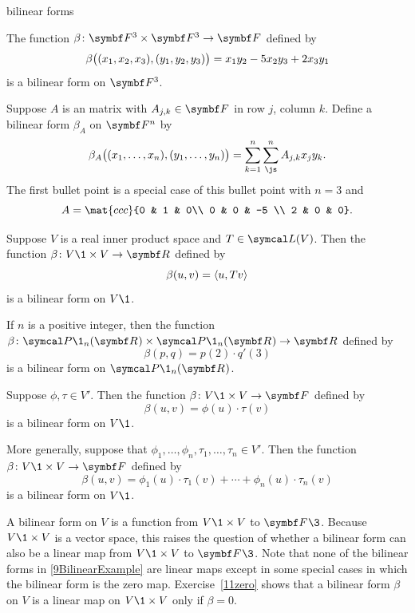 \begin{example}[9BilinearExample]{bilinear forms}
\begin{Itemize}
\item
The function $\fun \beta {\F3 \times \F3} {\F{}}$ defined by
\[
\beta\paren[\big]{ (x_1, x_2, x_3), (y_1, y_2, y_3) } = x_1 y_2 - 5 x_2 y_3 + 2 x_3 y_1
\]
is a bilinear form on $\F3$.

\item
Suppose $A$ is an  matrix with $A_{j,k} \in \F{}$ in row $j$, column $k$. Define a bilinear form $\beta_A$ on $\F n$ by
\[
\beta_A\paren[\big]{ (x_1, \ldots, x_n), (y_1, \ldots, y_n) } = \sum_{k=1}^n \sum_{\js}^n A_{j,k} x_j y_k.
\]
The first bullet point is a special case of this bullet point with $n = 3$ and
\[
A = \mat{ccc}{0 & 1 & 0\\
0 & 0 & -5 \\
2 & 0 & 0}.
\]

\item
Suppose $V$ is a real inner product space and $T \in \L(V)$. Then the function $\fun \beta {V\1 \times V} {\R{}}$ defined by
\[
\beta(u, v) = \ip{u, Tv}
\]
is a bilinear form on $V\1$.

\item
If $n$ is a positive integer, then the function $\fun \beta { \P\1_n(\R{}) \times \P\1_n(\R{}) } {\R{}}$ defined by
\[
\beta(p,q) = p(2) \cdot q'(3)
\]
is a bilinear form on $\P\1_n(\R{})$.

\item
Suppose $\phi, \tau \in V'\!$. Then the function $\fun \beta {V\1 \times V} {\F{}}$ defined by
\[
\beta(u, v) = \phi(u) \cdot \tau(v)
\]
is a bilinear form on $V\1$.

\item
More generally, suppose that $\phi_1, \ldots, \phi_n, \tau_1, \ldots, \tau_n \in V'\!$. Then the function
$\fun \beta {V\1 \times V} {\F{}}$ defined by
\[
\beta(u, v) = \phi_1(u) \cdot \tau_1(v) + \cdots + \phi_n(u) \cdot \tau_n(v)
\]
is a bilinear form on $V\1$.
\end{Itemize}
\exampleitemend
\end{example}

A bilinear form on $V$ is a function from $V\1 \times V$ to $\F{}\3$. Because $V\1 \times V$ is a vector space, this raises the question of whether a bilinear form can also be a linear map from $V\1 \times V$ to $\F{}\3$. Note that none of the bilinear forms in \ref{9BilinearExample} are linear maps except in some special cases in which the bilinear form is the zero map. Exercise~\ref{11zero} shows that a bilinear form $\beta$ on $V$ is a linear map on $V\1 \times V$ only if $\beta = 0$.

